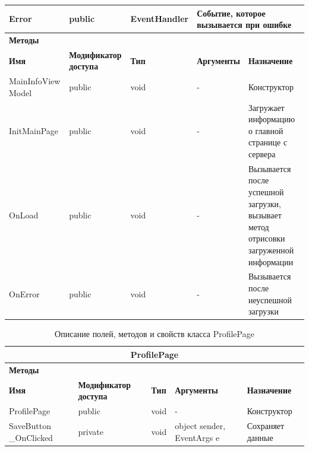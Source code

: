 \documentclass{../includes/TechDoc}
\begin{document}
\begin{table}[ht]
\begin{tabular}{|p{3.2cm}|p{3cm}|p{3.8cm}|p{3cm}|p{3cm}|}
            Error & public & EventHandler & \multicolumn{2}{p{6.8cm}|}{Событие, которое вызывается при ошибке} \\ \hline
            \multicolumn{5}{|l|}{\textbf{Методы}} \\ \hline
            \textbf{Имя} & \textbf{Модификатор доступа} & \textbf{Тип} & \textbf{Аргументы} & \textbf{Назначение} \\ \hline
            MainInfoView Model & public & void & - & Конструктор \\ \hline
            InitMainPage & public & void & - & Загружает информацию о главной странице с сервера \\ \hline
            OnLoad & public & void & - & Вызывается после успешной загрузки, вызывает метод отрисовки загруженной информации \\ \hline
            OnError & public & void & - & Вызывается после неуспешной загрузки \\ \hline
        \end{tabular}
    \end{table}

    \newpage

    \begin{table}[ht]
        \caption{\label{tab:class-profilepage-table}Описание полей, методов и свойств класса ProfilePage}
        \centering
        \begin{tabular}{|p{3.2cm}|p{3cm}|p{3.8cm}|p{3cm}|p{3cm}|}
            \hline
            \multicolumn{5}{|c|}{ProfilePage} \\ \hline
            \multicolumn{5}{|l|}{\textbf{Методы}} \\ \hline
            \textbf{Имя} & \textbf{Модификатор доступа} & \textbf{Тип} & \textbf{Аргументы} & \textbf{Назначение} \\ \hline
            ProfilePage & public & void & - & Конструктор \\ \hline
            SaveButton \_OnClicked & private & void & object sender, EventArgs e & Сохраняет данные \\ \hline
        \end{tabular}
    \end{table}

    \newpage
\end{document}
